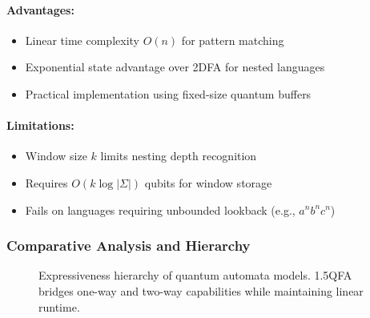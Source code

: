 \paragraph{Advantages:}
\begin{itemize}
    \item Linear time complexity $O(n)$ for pattern matching
    \item Exponential state advantage over 2DFA for nested languages
    \item Practical implementation using fixed-size quantum buffers
\end{itemize}

\paragraph{Limitations:}
\begin{itemize}
    \item Window size $k$ limits nesting depth recognition
    \item Requires $O(k\log|\Sigma|)$ qubits for window storage
    \item Fails on languages requiring unbounded lookback (e.g., $a^nb^nc^n$)
\end{itemize}

\subsubsection*{Comparative Analysis and Hierarchy}
\begin{figure}[h]
\centering
{}
\caption{Expressiveness hierarchy of quantum automata models. 1.5QFA bridges one-way and two-way capabilities while maintaining linear runtime.}
\label{fig:1.5qfa-hierarchy}
\end{figure}

